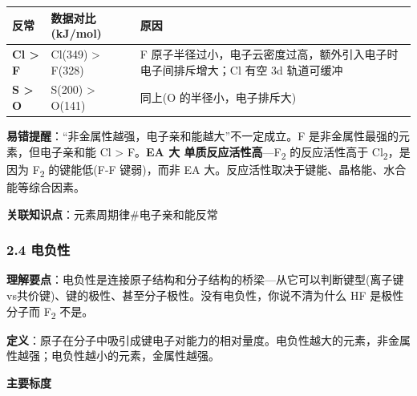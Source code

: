 {\def\LTcaptype{none} %
\begin{longtable}[]{@{}
  >{\raggedright\arraybackslash}p{}
  >{\raggedright\arraybackslash}p{}
  >{\raggedright\arraybackslash}p{}@{}}
\toprule\noalign{}
\begin{minipage}[b]{\linewidth}\raggedright
反常
\end{minipage} & \begin{minipage}[b]{\linewidth}\raggedright
数据对比 (kJ/mol)
\end{minipage} & \begin{minipage}[b]{\linewidth}\raggedright
原因
\end{minipage} \\
\midrule\noalign{}
\endhead
\bottomrule\noalign{}
\endlastfoot
\textbf{Cl \textgreater{} F} & Cl(349) \textgreater{} F(328) & F 原子半径过小，电子云密度过高，额外引入电子时电子间排斥增大；Cl 有空 3d 轨道可缓冲 \\
\textbf{S \textgreater{} O} & S(200) \textgreater{} O(141) & 同上(O 的半径小，电子排斥大) \\
\end{longtable}
}

\textbf{易错提醒}：``非金属性越强，电子亲和能越大''不一定成立。F 是非金属性最强的元素，但电子亲和能 Cl \textgreater{} F。\textbf{EA 大  单质反应活性高}---F\textsubscript{2} 的反应活性高于 Cl\textsubscript{2}，是因为 F\textsubscript{2} 的键能低(F-F 键弱)，而非 EA 大。反应活性取决于键能、晶格能、水合能等综合因素。

\textbf{关联知识点}：元素周期律\#电子亲和能反常

\subsubsection{2.4 电负性}\label{ux7535ux8d1fux6027}

\textbf{理解要点}：电负性是连接原子结构和分子结构的桥梁---从它可以判断键型(离子键vs共价键)、键的极性、甚至分子极性。没有电负性，你说不清为什么 HF 是极性分子而 F\textsubscript{2} 不是。

\textbf{定义}：原子在分子中吸引成键电子对能力的相对量度。电负性越大的元素，非金属性越强；电负性越小的元素，金属性越强。

\textbf{主要标度}

